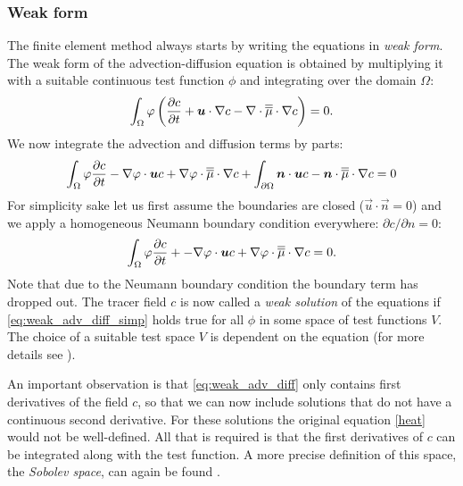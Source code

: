 \subsubsection{Weak form}
   The finite element method always starts by writing the
equations in \emph{weak form}.  The weak form of the advection-diffusion
equation is obtained by multiplying it with a suitable continuous test
function $\phi$ and integrating over the domain $\Omega$:
\begin{equation}
  \int_\Omega \varphi \left( \frac{\partial c}{\partial t} + {\mbox{\boldmath$u$}}\cdot\nabla c - 
    \nabla\cdot\overline{\overline{\mu}}\cdot \nabla c\right) = 0.
\end{equation}
We now integrate the advection and diffusion terms by parts:
\begin{equation}\label{eq:weak_adv_diff}
  \int_\Omega 
  \varphi \frac{\partial c}{\partial t} 
  -\nabla\varphi\cdot{\mbox{\boldmath$u$}} c +
  \nabla\varphi\cdot \overline{\overline{\mu}}\cdot\nabla c 
  +\int_{\partial\Omega} {\mbox{\boldmath$n$}}\cdot {\mbox{\boldmath$u$}} c 
  - {\mbox{\boldmath$n$}}\cdot\overline{\overline{\mu}}\cdot\nabla c 
  = 0
\end{equation}
For simplicity sake let us first assume the boundaries are closed
($\vec{u}\cdot\vec{n}=0$) and we apply a homogeneous Neumann boundary
condition everywhere: $\partial c/\partial n=0$:
\begin{equation}\label{eq:weak_adv_diff_simp}
  \int_\Omega \varphi \frac{\partial c}{\partial t} + 
    -\nabla\varphi\cdot{\mbox{\boldmath$u$}} c + 
    \nabla\varphi\cdot \overline{\overline{\mu}}\cdot\nabla c = 0. 
\end{equation}
Note that due to the Neumann boundary condition the boundary term has
dropped out. The tracer field $c$ is now called a \emph{weak solution} of
the equations if \eqref{eq:weak_adv_diff_simp} holds true for all $\phi$ in some
space of test functions $V$. The choice of a suitable test space $V$ is dependent
on the equation (for more details see \citet{elman05}).

 An important observation is that
\eqref{eq:weak_adv_diff} only contains first derivatives of the field $c$,
so that we can now include solutions that do not have a continuous second
derivative. For these solutions the original equation \eqref{heat} would not
be well-defined. All that is required is that the first derivatives of $c$
can be integrated along with the test function. A more precise definition of
this space, the \emph{Sobolev space}, can again be found \citet{elman05}.

